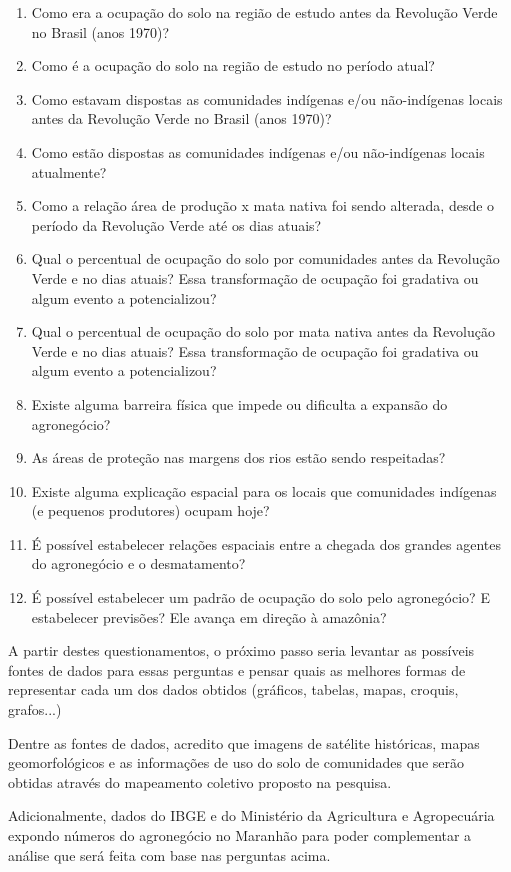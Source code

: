 \begin{enumerate}
  \item Como era a ocupação do solo na região de estudo antes da Revolução Verde no Brasil (anos 1970)?
  \item Como é a ocupação do solo na região de estudo no período atual?
  \item Como estavam dispostas as comunidades indígenas e/ou não-indígenas locais antes da Revolução Verde no Brasil (anos 1970)?
  \item Como estão dispostas as comunidades indígenas e/ou não-indígenas locais atualmente?
  \item Como a relação área de produção x mata nativa foi sendo alterada, desde o período da Revolução Verde até os dias atuais?
  \item Qual o percentual de ocupação do solo por comunidades antes da Revolução Verde e no dias atuais? Essa transformação de ocupação foi gradativa ou algum evento a potencializou?
  \item Qual o percentual de ocupação do solo por mata nativa antes da Revolução Verde e no dias atuais? Essa transformação de ocupação foi gradativa ou algum evento a potencializou?
  \item Existe alguma barreira física que impede ou dificulta a expansão do agronegócio?
  \item As áreas de proteção nas margens dos rios estão sendo respeitadas?
  \item Existe alguma explicação espacial para os locais que comunidades indígenas (e pequenos produtores) ocupam hoje?
  \item É possível estabelecer relações espaciais entre a chegada dos grandes agentes do agronegócio e o desmatamento?
  \item É possível estabelecer um padrão de ocupação do solo pelo agronegócio? E estabelecer previsões? Ele avança em direção à amazônia?
\end{enumerate}

A partir destes questionamentos, o próximo passo seria levantar as possíveis fontes de dados para essas perguntas e pensar quais as melhores formas de representar cada um dos dados obtidos (gráficos, tabelas, mapas, croquis, grafos...)

Dentre as fontes de dados, acredito que imagens de satélite históricas, mapas geomorfológicos e as informações de uso do solo de comunidades que serão obtidas através do mapeamento coletivo proposto na pesquisa.

Adicionalmente, dados do IBGE e do Ministério da Agricultura e Agropecuária expondo números do agronegócio no Maranhão para poder complementar a análise que será feita com base nas perguntas acima.

